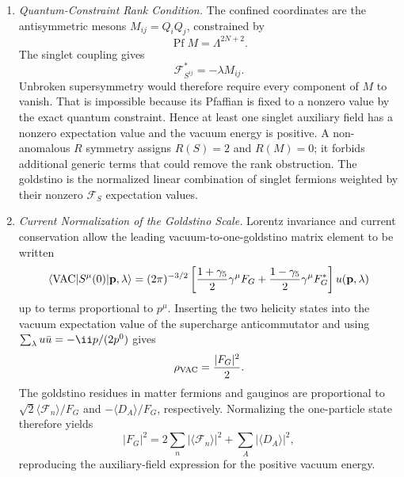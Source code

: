 \begin{enumerate}
  \begin{enumerate}
    \item \emph{Quantum-Constraint Rank Condition.}
    The confined coordinates are the antisymmetric mesons
      \(M_{ij}=Q_iQ_j\), constrained by
      \[
        \operatorname{Pf}M=\Lambda^{2N+2}.
      \]
      The singlet coupling gives
      \[
        \mathcal F_{S^{ij}}^*
          =-\lambda M_{ij}.
      \]
      Unbroken supersymmetry would therefore require every component of
      \(M\) to vanish.  That is impossible because its Pfaffian is fixed to
      a nonzero value by the exact quantum constraint.  Hence at least one
      singlet auxiliary field has a nonzero expectation value and the
      vacuum energy is positive.  A non-anomalous \(R\) symmetry assigns
      \(R(S)=2\) and \(R(M)=0\); it forbids additional generic terms that
      could remove the rank obstruction.  The goldstino is the normalized
      linear combination of singlet fermions weighted by their nonzero
      \(\mathcal F_S\) expectation values.
    \item \emph{Current Normalization of the Goldstino Scale.}
    Lorentz invariance and current conservation allow the leading
      vacuum-to-one-goldstino matrix element to be written
      \[
        \langle{\rm VAC}\lvert S^\mu(0)
          \rvert\mathbf p,\lambda\rangle
          =(2\pi)^{-3/2}
           \left[
            \frac{1+\gamma_5}{2}\gamma^\mu F_G
            +\frac{1-\gamma_5}{2}\gamma^\mu F_G^*
           \right]u(\mathbf p,\lambda)
      \]
      up to terms proportional to \(p^\mu\).  Inserting the two helicity
      states into the vacuum expectation value of the supercharge
      anticommutator and using
      \(\sum_\lambda u\bar u=-\ii\sl{p}/(2p^0)\) gives
      \[
        \rho_{\rm VAC}=\frac{\lvert F_G\rvert^2}{2}.
      \]
      The goldstino residues in matter fermions and gauginos are proportional
      to \(\sqrt2\langle\mathcal F_n\rangle/F_G\) and
      \(-\langle D_A\rangle/F_G\), respectively.  Normalizing the one-particle
      state therefore yields
      \[
        \lvert F_G\rvert^2
          =2\sum_n\lvert\langle\mathcal F_n\rangle\rvert^2
           +\sum_A\lvert\langle D_A\rangle\rvert^2,
      \]
      reproducing the auxiliary-field expression for the positive vacuum
      energy.
  \end{enumerate}


\end{enumerate}

